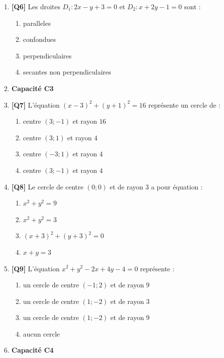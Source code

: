 \begin{enumerate}
\item \textbf{[Q6]} Les droites $D_1 : 2x - y + 3 = 0$ et $D_2 : x + 2y - 1 = 0$ sont :
  \begin{enumerate}[label=\Alph*.]
    \item paralleles
    \item confondues
    \item perpendiculaires
    \item secantes non perpendiculaires
  \end{enumerate}

\item[] \textbf{Capacité C3}

\item \textbf{[Q7]} L'équation $(x - 3)^2 + (y + 1)^2 = 16$ représente un cercle de :
  \begin{enumerate}[label=\Alph*.]
    \item centre $(3 ; -1)$ et rayon $16$
    \item centre $(3 ; 1)$ et rayon $4$
    \item centre $(-3 ; 1)$ et rayon $4$
    \item centre $(3 ; -1)$ et rayon $4$
  \end{enumerate}

\item \textbf{[Q8]} Le cercle de centre $(0 ; 0)$ et de rayon $3$ a pour équation :
  \begin{enumerate}[label=\Alph*.]
    \item $x^2 + y^2 = 9$
    \item $x^2 + y^2 = 3$
    \item $(x + 3)^2 + (y + 3)^2 = 0$
    \item $x + y = 3$
  \end{enumerate}

\item \textbf{[Q9]} L'équation $x^2 + y^2 - 2x + 4y - 4 = 0$ représente :
  \begin{enumerate}[label=\Alph*.]
    \item un cercle de centre $(-1 ; 2)$ et de rayon $9$
    \item un cercle de centre $(1 ; -2)$ et de rayon $3$
    \item un cercle de centre $(1 ; -2)$ et de rayon $9$
    \item aucun cercle
  \end{enumerate}

\item[] \textbf{Capacité C4}


\end{enumerate}
